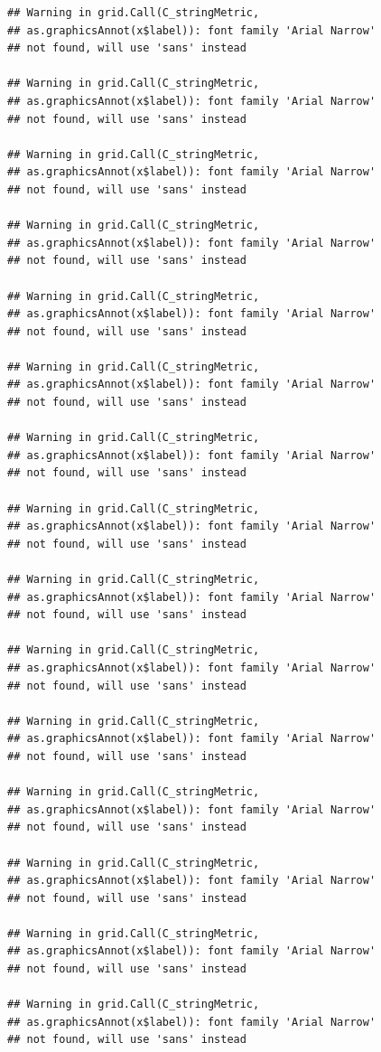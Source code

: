 \documentclass[]{krantz}
\begin{document}
\begin{verbatim}
## Warning in grid.Call(C_stringMetric,
## as.graphicsAnnot(x$label)): font family 'Arial Narrow'
## not found, will use 'sans' instead

## Warning in grid.Call(C_stringMetric,
## as.graphicsAnnot(x$label)): font family 'Arial Narrow'
## not found, will use 'sans' instead

## Warning in grid.Call(C_stringMetric,
## as.graphicsAnnot(x$label)): font family 'Arial Narrow'
## not found, will use 'sans' instead

## Warning in grid.Call(C_stringMetric,
## as.graphicsAnnot(x$label)): font family 'Arial Narrow'
## not found, will use 'sans' instead

## Warning in grid.Call(C_stringMetric,
## as.graphicsAnnot(x$label)): font family 'Arial Narrow'
## not found, will use 'sans' instead

## Warning in grid.Call(C_stringMetric,
## as.graphicsAnnot(x$label)): font family 'Arial Narrow'
## not found, will use 'sans' instead

## Warning in grid.Call(C_stringMetric,
## as.graphicsAnnot(x$label)): font family 'Arial Narrow'
## not found, will use 'sans' instead

## Warning in grid.Call(C_stringMetric,
## as.graphicsAnnot(x$label)): font family 'Arial Narrow'
## not found, will use 'sans' instead

## Warning in grid.Call(C_stringMetric,
## as.graphicsAnnot(x$label)): font family 'Arial Narrow'
## not found, will use 'sans' instead

## Warning in grid.Call(C_stringMetric,
## as.graphicsAnnot(x$label)): font family 'Arial Narrow'
## not found, will use 'sans' instead

## Warning in grid.Call(C_stringMetric,
## as.graphicsAnnot(x$label)): font family 'Arial Narrow'
## not found, will use 'sans' instead

## Warning in grid.Call(C_stringMetric,
## as.graphicsAnnot(x$label)): font family 'Arial Narrow'
## not found, will use 'sans' instead

## Warning in grid.Call(C_stringMetric,
## as.graphicsAnnot(x$label)): font family 'Arial Narrow'
## not found, will use 'sans' instead

## Warning in grid.Call(C_stringMetric,
## as.graphicsAnnot(x$label)): font family 'Arial Narrow'
## not found, will use 'sans' instead

## Warning in grid.Call(C_stringMetric,
## as.graphicsAnnot(x$label)): font family 'Arial Narrow'
## not found, will use 'sans' instead


\end{verbatim}
\end{document}

